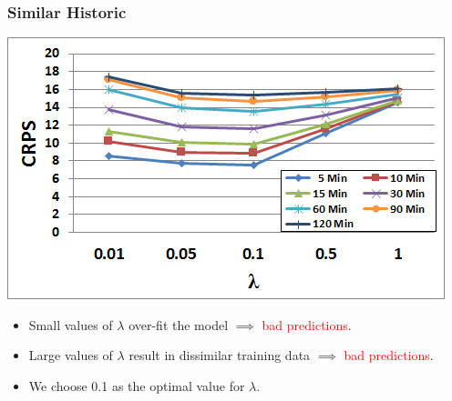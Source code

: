 \documentclass[t]{beamer}
\begin{document}
\begin{frame}\frametitle{Similar Historic}
\begin{center}
	\includegraphics[scale=0.45]{Links_Filtered.jpg}
\end{center}
\begin{itemize}
\item Small values of $\lambda$ over-fit the model $\implies$ \textcolor{red}{bad predictions}.
\item Large values of $\lambda$ result in dissimilar training data $\implies$ \textcolor{red}{bad predictions}.
\item We choose \textcolor{mygreen}{0.1} as the optimal value for $\lambda$.
\end{itemize}
\end{frame}
\end{document}
